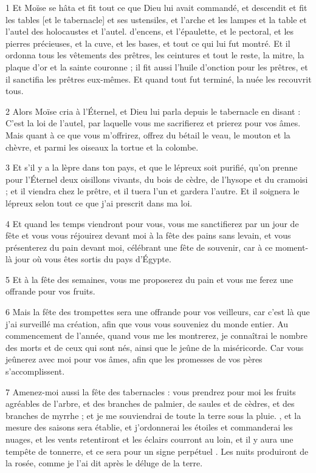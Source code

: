 
\par 1 Et Moïse se hâta et fit tout ce que Dieu lui avait commandé, et descendit et fit les tables [et le tabernacle] et ses ustensiles, et l'arche et les lampes et la table et l'autel des holocaustes et l'autel. d'encens, et l'épaulette, et le pectoral, et les pierres précieuses, et la cuve, et les bases, et tout ce qui lui fut montré. Et il ordonna tous les vêtements des prêtres, les ceintures et tout le reste, la mitre, la plaque d'or et la sainte couronne ; il fit aussi l'huile d'onction pour les prêtres, et il sanctifia les prêtres eux-mêmes. Et quand tout fut terminé, la nuée les recouvrit tous.

\par 2 Alors Moïse cria à l'Éternel, et Dieu lui parla depuis le tabernacle en disant : C'est la loi de l'autel, par laquelle vous me sacrifierez et prierez pour vos âmes. Mais quant à ce que vous m'offrirez, offrez du bétail le veau, le mouton et la chèvre, et parmi les oiseaux la tortue et la colombe.

\par 3 Et s'il y a la lèpre dans ton pays, et que le lépreux soit purifié, qu'on prenne pour l'Éternel deux oisillons vivants, du bois de cèdre, de l'hysope et du cramoisi ; et il viendra chez le prêtre, et il tuera l'un et gardera l'autre. Et il soignera le lépreux selon tout ce que j'ai prescrit dans ma loi.

\par 4 Et quand les temps viendront pour vous, vous me sanctifierez par un jour de fête et vous vous réjouirez devant moi à la fête des pains sans levain, et vous présenterez du pain devant moi, célébrant une fête de souvenir, car à ce moment-là jour où vous êtes sortis du pays d’Égypte.

\par 5 Et à la fête des semaines, vous me proposerez du pain et vous me ferez une offrande pour vos fruits.

\par 6 Mais la fête des trompettes sera une offrande pour vos veilleurs, car c'est là que j'ai surveillé ma création, afin que vous vous souveniez du monde entier. Au commencement de l'année, quand vous me les montrerez, je connaîtrai le nombre des morts et de ceux qui sont nés, ainsi que le jeûne de la miséricorde. Car vous jeûnerez avec moi pour vos âmes, afin que les promesses de vos pères s'accomplissent.

\par 7 Amenez-moi aussi la fête des tabernacles : vous prendrez pour moi les fruits agréables de l'arbre, et des branches de palmier, de saules et de cèdres, et des branches de myrrhe ; et je me souviendrai de toute la terre sous la pluie. , et la mesure des saisons sera établie, et j'ordonnerai les étoiles et commanderai les nuages, et les vents retentiront et les éclairs courront au loin, et il y aura une tempête de tonnerre, et ce sera pour un signe perpétuel . Les nuits produiront de la rosée, comme je l'ai dit après le déluge de la terre.

